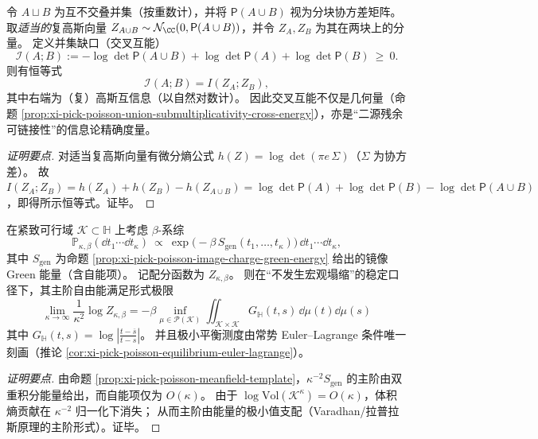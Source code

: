 \begin{proposition}\label{prop:xi-cross-energy-gaussian-mutual-information}
令 \(A\sqcup B\) 为互不交叠并集（按重数计），并将 \(\mathsf P(A\cup B)\) 视为分块协方差矩阵。
取\emph{适当的}复高斯向量 \(Z_{A\cup B}\sim\mathcal N_{\CC}(0,\mathsf P(A\cup B))\)，并令 \(Z_A,Z_B\) 为其在两块上的分量。
定义并集缺口（交叉互能）
\[
\mathcal I(A;B):=-\log\det\mathsf P(A\cup B)+\log\det\mathsf P(A)+\log\det\mathsf P(B)\ \ge\ 0.
\]
则有恒等式
\[
\boxed{\;
\mathcal I(A;B)=I(Z_A;Z_B),\;}
\]
其中右端为（复）高斯互信息（以自然对数计）。
因此交叉互能不仅是几何量（命题 \ref{prop:xi-pick-poisson-union-submultiplicativity-cross-energy}），亦是“二源残余可链接性”的信息论精确度量。
\end{proposition}
\begin{proof}[证明要点]
对适当复高斯向量有微分熵公式 \(h(Z)=\log\det(\pi e\,\Sigma)\)（\(\Sigma\) 为协方差）。
故
\(
I(Z_A;Z_B)=h(Z_A)+h(Z_B)-h(Z_{A\cup B})
=\log\det\mathsf P(A)+\log\det\mathsf P(B)-\log\det\mathsf P(A\cup B)
\)，即得所示恒等式。证毕。
\end{proof}

\begin{proposition}\label{prop:xi-beta-ensemble-leading-free-energy}
在紧致可行域 \(\mathcal K\subset\mathbb H\) 上考虑 \(\beta\)-系综
\[
\mathbb P_{\kappa,\beta}(\dd t_1\cdots \dd t_\kappa)
\ \propto\
\exp\!\bigl(-\beta\,S_{\mathrm{gen}}(t_1,\dots,t_\kappa)\bigr)\,\dd t_1\cdots \dd t_\kappa,
\]
其中 \(S_{\mathrm{gen}}\) 为命题 \ref{prop:xi-pick-poisson-image-charge-green-energy} 给出的镜像 Green 能量（含自能项）。
记配分函数为 \(Z_{\kappa,\beta}\)。
则在“不发生宏观塌缩”的稳定口径下，其主阶自由能满足形式极限
\[
\boxed{\;
\lim_{\kappa\to\infty}\frac{1}{\kappa^2}\log Z_{\kappa,\beta}
=-\beta\inf_{\mu\in\mathcal P(\mathcal K)}
\iint_{\mathcal K\times\mathcal K}G_{\mathbb H}(t,s)\,\dd\mu(t)\dd\mu(s)\;}
\]
其中 \(G_{\mathbb H}(t,s)=\log\left|\frac{t-\overline s}{t-s}\right|\)。
并且极小平衡测度由常势 Euler--Lagrange 条件唯一刻画（推论 \ref{cor:xi-pick-poisson-equilibrium-euler-lagrange}）。
\end{proposition}
\begin{proof}[证明要点]
由命题 \ref{prop:xi-pick-poisson-meanfield-template}，\(\kappa^{-2}S_{\mathrm{gen}}\) 的主阶由双重积分能量给出，而自能项仅为 \(O(\kappa)\)。
由于 \(\log\mathrm{Vol}(\mathcal K^\kappa)=O(\kappa)\)，体积熵贡献在 \(\kappa^{-2}\) 归一化下消失；
从而主阶由能量的极小值支配（Varadhan/拉普拉斯原理的主阶形式）。证毕。
\end{proof}

